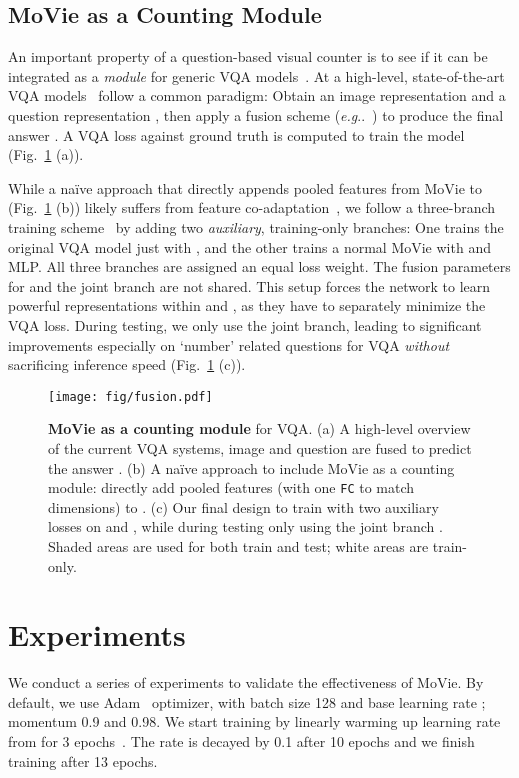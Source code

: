 \documentclass{article} \usepackage[dvipsnames,table]{xcolor}
\makeatletter
\newcommand{\ours}[0]{MoVie\xspace}
\def\x{\xspace}
\newcommand{\fc}{\texttt{FC}\xspace}
\DeclareRobustCommand\onedot{\futurelet\@let@token\@onedot}
\def\@onedot{\ifx\@let@token.\else.\null\fi\xspace}
\def\eg{\emph{e.g}\onedot} \def\Eg{\emph{E.g}\onedot}
\makeatother
\begin{document}
\subsection{\ours as a Counting Module\label{sec:counter}}
An important property of a question-based visual counter is to see if it can be integrated as a \emph{module} for generic VQA models~\cite{zhang2018learning}. At a high-level, state-of-the-art VQA models~\cite{jiang2018pythia,yu2019deep} follow a common paradigm: Obtain an image representation  and a question representation , then apply a fusion scheme (\eg~\cite{fukui2016multimodal}) to produce the final answer . A VQA loss  against ground truth  is computed to train the model (Fig.~\ref{fig:fusion} (a)).

While a na\"{i}ve approach that directly appends pooled features  from \ours to  (Fig.~\ref{fig:fusion} (b)) likely suffers from feature co-adaptation~\cite{hinton2012improving}, we follow a three-branch training scheme~\cite{wang2019makes,qi2020imvotenet} by adding two \emph{auxiliary}, training-only branches: One trains the original VQA model just with , and the other trains a normal \ours with  and MLP. All three branches are assigned an equal loss weight. The fusion parameters for  and the joint branch  are not shared. This setup forces the network to learn powerful representations within  and , as they have to separately minimize the VQA loss. During testing, we only use the joint branch, leading to significant improvements especially on `number' related questions for VQA \emph{without} sacrificing inference speed (Fig.~\ref{fig:fusion} (c)).

\begin{figure}[t]
\centering
\texttt{[image: fig/fusion.pdf]}
\caption{\label{fig:fusion}\textbf{\ours as a counting module} for VQA. (a) A high-level overview of the current VQA systems, image  and question  are fused to predict the answer . (b) A na\"{i}ve approach to include \ours as a counting module: directly add pooled features  (with one \fc to match dimensions) to . (c) Our final design to train with two auxiliary losses on  and , while during testing only using the joint branch . Shaded areas are used for both train and test; white areas are train-only.}
\end{figure}


\section{Experiments}
We conduct a series of experiments to validate the effectiveness of \ours. By default, we use Adam~\cite{kingma2015adam} optimizer, with batch size 128 and base learning rate ; momentum 0.9 and 0.98. We start training by linearly warming up learning rate from  for 3 epochs~\cite{yu2019deep}. The rate is decayed by 0.1{\x} after 10 epochs and we finish training after 13 epochs.  
\end{document}
